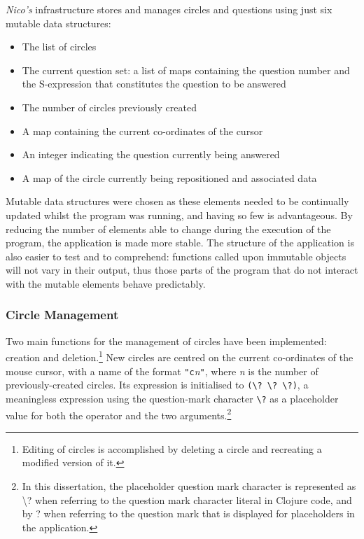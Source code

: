 \documentclass[12pt,twoside,notitlepage,xetex]{report}
\begin{document}
\emph{Nico's} infrastructure stores and manages circles and questions using just six mutable data structures:
\begin{itemize}
\item The list of circles
\item The current question set: a list of maps containing the question number and the S-expression that constitutes the question to be answered
\item The number of circles previously created
\item A map containing the current co-ordinates of the cursor
\item An integer indicating the question currently being answered
\item A map of the circle currently being repositioned and associated data
\end{itemize}

Mutable data structures were chosen as these elements needed to be continually updated whilst the program was running, and having so few is advantageous.  By reducing the number of elements able to change during the execution of the program, the application is made more stable.  The structure of the application is also easier to test and to comprehend: functions called upon immutable objects will not vary in their output, thus those parts of the program that do not interact with the mutable elements behave predictably.

%
\subsubsection{Circle Management}

Two main functions for the management of circles have been implemented: creation and deletion.\footnote{Editing of circles is accomplished by deleting a circle and recreating a modified version of it.}  New circles are centred on the current co-ordinates of the mouse cursor, with a name of the format \verb¬"c¬\emph{n}\verb¬"¬, where \emph{n} is the number of previously-created circles.  Its expression is initialised to \verb¬(\? \? \?)¬, a meaningless expression using the question-mark character \verb¬\?¬ as a placeholder value for both the operator and the two arguments.\footnote{In this dissertation, the placeholder question mark character is represented as {\ttfamily \textbackslash?} when referring to the question mark character literal in Clojure code, and by {\sfapp ?} when referring to the question mark that is displayed for placeholders in the application.}
\end{document}
